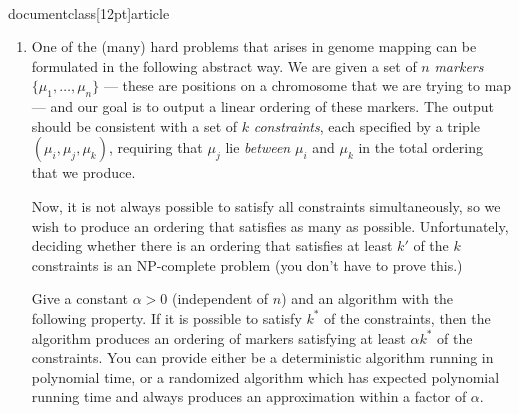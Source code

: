 \\documentclass[12pt]{article}
\begin{document}
\begin{enumerate}
{}


\item 

One of the (many) hard problems that arises in
genome mapping can be formulated in the following abstract way.
We are given a set of $n$ {\em markers}
$\{\mu_1, \ldots, \mu_n\}$ --- these are positions
on a chromosome that we are trying to map ---
and our goal is to output a linear ordering of these markers.
The output should be consistent with a set of $k$ {\em constraints},
each specified by a triple $(\mu_i, \mu_j, \mu_k)$,
requiring that $\mu_j$ lie {\em between} $\mu_i$ and
$\mu_k$ in the total ordering that we produce.

Now, it is not always possible to satisfy all constraints
simultaneously, so we wish to produce an ordering that
satisfies as many as possible.
Unfortunately, deciding whether there is an ordering
that satisfies at least $k'$ of the $k$ constraints
is an NP-complete problem (you don't have to prove this.)

Give a constant $\alpha > 0$ (independent of $n$) and
an algorithm with the following property.
If it is possible to satisfy $k^*$ of the constraints,
then the algorithm produces an ordering of markers satisfying
at least $\alpha k^*$ of the constraints.
You can provide either be a deterministic
algorithm running in polynomial time,
or a randomized algorithm which has
expected polynomial running time and
always produces an approximation within a factor of $\alpha$.

\end{enumerate}
\end{document}
